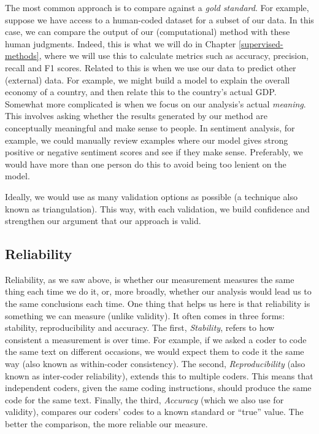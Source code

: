 \documentclass[
]{book}
\begin{document}
The most common approach is to compare against a \emph{gold standard}. For example, suppose we have access to a human-coded dataset for a subset of our data. In this case, we can compare the output of our (computational) method with these human judgments. Indeed, this is what we will do in Chapter \ref{supervised-methods}, where we will use this to calculate metrics such as accuracy, precision, recall and F1 scores. Related to this is when we use our data to predict other (external) data. For example, we might build a model to explain the overall economy of a country, and then relate this to the country's actual GDP. Somewhat more complicated is when we focus on our analysis's actual \emph{meaning}. This involves asking whether the results generated by our method are conceptually meaningful and make sense to people. In sentiment analysis, for example, we could manually review examples where our model gives strong positive or negative sentiment scores and see if they make sense. Preferably, we would have more than one person do this to avoid being too lenient on the model.

Ideally, we would use as many validation options as possible (a technique also known as triangulation). This way, with each validation, we build confidence and strengthen our argument that our approach is valid.

\subsection{Reliability}\label{reliability}

Reliability, as we saw above, is whether our measurement measures the same thing each time we do it, or, more broadly, whether our analysis would lead us to the same conclusions each time. One thing that helps us here is that reliability is something we can measure (unlike validity). It often comes in three forms: stability, reproducibility and accuracy. The first, \emph{Stability}, refers to how consistent a measurement is over time. For example, if we asked a coder to code the same text on different occasions, we would expect them to code it the same way (also known as within-coder consistency). The second, \emph{Reproducibility} (also known as inter-coder reliability), extends this to multiple coders. This means that independent coders, given the same coding instructions, should produce the same code for the same text. Finally, the third, \emph{Accuracy} (which we also use for validity), compares our coders' codes to a known standard or ``true'' value. The better the comparison, the more reliable our measure.
\end{document}

